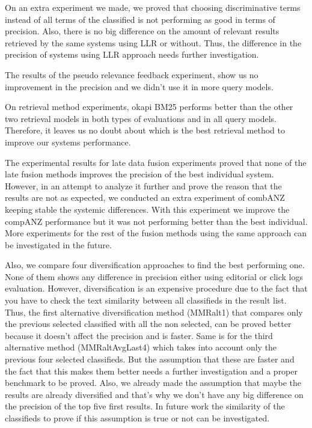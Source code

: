 On an extra experiment we made, we proved that choosing discriminative terms instead of all terms of the classified is not performing as good in terms of precision. Also, there is no big difference on the amount of relevant results retrieved by the same systems using LLR or without. Thus, the difference in the precision of systems using LLR approach needs further investigation.

The results of the pseudo relevance feedback experiment, show us no improvement in the precision and we didn't use it in more query models.

On retrieval method experiments, okapi BM25 performs better than the other two retrieval models in both types of evaluations and in all query models. Therefore, it leaves us no doubt about which is the best retrieval method to improve our systems performance.

The experimental results for late data fusion experiments proved that none of the late fusion methods improves the precision of the best individual system. However, in an attempt to analyze it further and prove the reason that the results are not as expected, we conducted an extra experiment of combANZ keeping stable the systemic differences. With this experiment we improve the compANZ performance but it was not performing better than the best individual. More experiments for the rest of the fusion methods using the same approach can be investigated in the future.

Also, we compare four diversification approaches to find the best performing one. None of them shows any difference in precision either using editorial or click logs evaluation. However, diversification is an expensive procedure due to the fact that you have to check the text similarity between all classifieds in the result list. Thus, the first alternative diversification method (MMRalt1) that compares only the previous selected classified with all the non selected, can be proved better because it doesn't affect the precision and is faster. Same is for the third alternative method (MMRaltAvgLast4) which takes into account only the previous four selected classifieds. But the assumption that these are faster and the fact that this makes them better needs a further investigation and a proper benchmark to be proved. Also, we already made the assumption that maybe the results are already diversified and that's why we don't have any big difference on the precision of the top five first results. In future work the similarity of the classifieds to prove if this assumption is true or not can be investigated.

